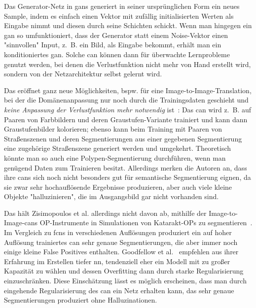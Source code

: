Das Generator-Netz in \glspl{gan} generiert in seiner ursprünglichen Form ein neues Sample, indem es einfach einen Vektor mit zufällig initialisierten Werten als Eingabe nimmt und diesen durch seine Schichten schickt.
Wenn man hingegen ein \gls{gan} so umfunktioniert, dass der Generator statt einem Noise-Vektor einen "sinnvollen" Input, z.~B. ein Bild, als Eingabe bekommt, erhält man ein konditioniertes \gls{gan}.
Solche \gls{can} können dann für überwachte Lernprobleme genutzt werden, bei denen die Verlustfunktion nicht mehr von Hand erstellt wird, sondern von der Netzarchitektur selbst gelernt wird.

Das eröffnet ganz neue Möglichkeiten, bspw. für eine Image-to-Image-Translation, bei der die Domänenanpassung nur noch durch die Trainingsdaten geschieht und \emph{keine Anpassung der Verlustfunktion mehr notwendig} ist~\cite{Isola.2017}:
Das \gls{can} wird z.~B. auf Paaren von Farbbildern und deren Graustufen-Variante trainiert und kann dann Graustufenbilder kolorieren; ebenso kann beim Training mit Paaren von Straßenszenen und deren Segmentierungen aus einer gegebenen Segmentierung eine zugehörige Straßenszene generiert werden und umgekehrt.
Theoretisch könnte man so auch eine Polypen-Segmentierung durchführen, wenn man genügend Daten zum Trainieren besitzt.
Allerdings merken die Autoren an, dass ihre \glspl{can} sich noch nicht besonders gut für semantische Segmentierung eignen, da sie zwar sehr hochauflösende Ergebnisse produzieren, aber auch viele kleine Objekte "halluzinieren", die im Ausgangsbild gar nicht vorhanden sind.

Das hält Zisimopoulos et al. allerdings nicht davon ab, mithilfe der Image-to-Image-\glspl{can} OP-Instrumente in Simulationen von Katarakt-OPs zu segmentieren~\cite{Zisimopoulos.2017}.
Im Vergleich zu \glspl{fcn} in verschiedenen Auflösungen produziert ein auf hoher Auflösung trainiertes \gls{can} sehr genaue Segmentierungen, die aber immer noch einige kleine False Positives enthalten.
Goodfellow et al.~\cite{Goodfellow.2016} empfehlen aus ihrer Erfahrung im Erstellen tiefer \gls{nn}, tendenziell eher ein Modell mit zu großer Kapazität zu wählen und dessen Overfitting dann durch starke Regularisierung einzuschränken.
Diese Einschätzung lässt es möglich erscheinen, dass man durch eingehende Regularisierung des \gls{can} ein Netz erhalten kann, das sehr genaue Segmentierungen produziert ohne Halluzinationen.

